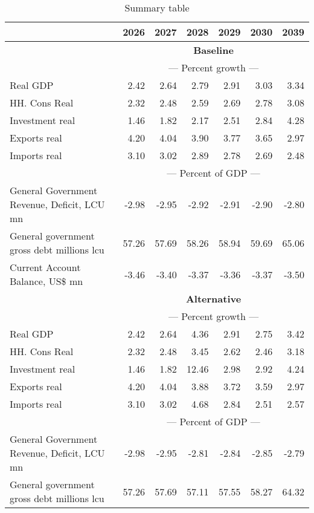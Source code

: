 \documentclass{article}
\begin{document}
\begin{table}[ht]
\caption{Summary table}
\begin{tabular}{lrrrrr|r}
\toprule
 & 2026 & 2027 & 2028 & 2029 & 2030 & 2039 \\
\midrule
&\multicolumn{6}{c}{{\large \textbf{Baseline}}}                               \\
&\multicolumn{6}{c}{{---  Percent growth ---}}                               \\
Real GDP & 2.42 & 2.64 & 2.79 & 2.91 & 3.03 & 3.34 \\
HH. Cons Real & 2.32 & 2.48 & 2.59 & 2.69 & 2.78 & 3.08 \\
Investment real & 1.46 & 1.82 & 2.17 & 2.51 & 2.84 & 4.28 \\
Exports real & 4.20 & 4.04 & 3.90 & 3.77 & 3.65 & 2.97 \\
Imports real & 3.10 & 3.02 & 2.89 & 2.78 & 2.69 & 2.48 \\
&\multicolumn{6}{c}{{---  Percent of GDP ---}}                               \\
General Government Revenue, Deficit, LCU mn & -2.98 & -2.95 & -2.92 & -2.91 & -2.90 & -2.80 \\
General government gross debt millions lcu & 57.26 & 57.69 & 58.26 & 58.94 & 59.69 & 65.06 \\
Current Account Balance, US\$ mn & -3.46 & -3.40 & -3.37 & -3.36 & -3.37 & -3.50 \\
&\multicolumn{6}{c}{{\large \textbf{Alternative}}}                               \\
&\multicolumn{6}{c}{{---  Percent growth ---}}                               \\
Real GDP & 2.42 & 2.64 & 4.36 & 2.91 & 2.75 & 3.42 \\
HH. Cons Real & 2.32 & 2.48 & 3.45 & 2.62 & 2.46 & 3.18 \\
Investment real & 1.46 & 1.82 & 12.46 & 2.98 & 2.92 & 4.24 \\
Exports real & 4.20 & 4.04 & 3.88 & 3.72 & 3.59 & 2.97 \\
Imports real & 3.10 & 3.02 & 4.68 & 2.84 & 2.51 & 2.57 \\
&\multicolumn{6}{c}{{---  Percent of GDP ---}}                               \\
General Government Revenue, Deficit, LCU mn & -2.98 & -2.95 & -2.81 & -2.84 & -2.85 & -2.79 \\
General government gross debt millions lcu & 57.26 & 57.69 & 57.11 & 57.55 & 58.27 & 64.32 \\

\end{tabular}
\end{table}
\end{document}
